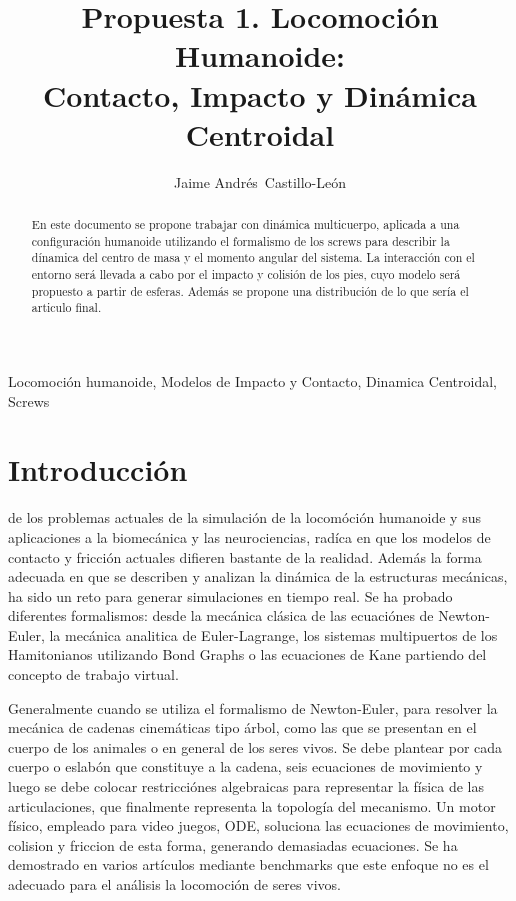\documentclass[journal,letterpaper,twoside,twocolumn]{IEEEtran}
\title{Propuesta 1. Locomoción Humanoide:\\Contacto, Impacto y Dinámica Centroidal}
\author{Jaime Andrés~Castillo-León}
\begin{document}
\maketitle
\begin{abstract}
  En este documento se propone trabajar con dinámica multicuerpo, aplicada a una configuración humanoide utilizando el formalismo de los screws para describir la dínamica del centro de masa y el momento angular del sistema. La interacción con el entorno será llevada a cabo por el impacto y colisión de los pies, cuyo modelo será propuesto a partir de esferas. Además se propone una distribución de lo que sería el articulo final.
\end{abstract}
\begin{IEEEkeywords}
  Locomoción humanoide, Modelos de Impacto y Contacto, Dinamica Centroidal, Screws
\end{IEEEkeywords}

\section{Introducción}
\label{sec:intro}
 de los problemas actuales de la simulación de la locomóción humanoide y sus aplicaciones a la biomecánica y las neurociencias, radíca en que los modelos de contacto y fricción actuales difieren bastante de la realidad\cite{Todorov2014}. Además la forma adecuada en que se describen y analizan la dinámica de la estructuras mecánicas, ha sido un reto para generar simulaciones en tiempo real\cite{Wensing2016}. Se ha probado diferentes formalismos: desde la mecánica clásica de las ecuaciónes de Newton-Euler, la mecánica analitica de Euler-Lagrange, los sistemas multipuertos de los Hamitonianos utilizando Bond Graphs o las ecuaciones de Kane partiendo del concepto de trabajo virtual. 

Generalmente cuando se utiliza el formalismo de Newton-Euler, para resolver la mecánica de cadenas cinemáticas tipo árbol, como las que se presentan en el cuerpo de los animales o en general de los seres vivos. Se debe plantear por cada cuerpo o eslabón que constituye a la cadena, seis ecuaciones de movimiento y luego se debe colocar restricciónes algebraicas para representar la física de las articulaciones, que finalmente representa la topología del mecanismo\cite{Taga1991}. Un motor físico, empleado para video juegos, ODE\cite{Smith2007}, soluciona las ecuaciones de movimiento, colision y friccion de esta forma, generando demasiadas ecuaciones. Se ha demostrado en varios artículos mediante benchmarks\cite{Sherman2011a,Erez2015} que este enfoque no es el adecuado para el análisis la locomoción de seres vivos\cite{Geijtenbeek2013,Wensing2015}.
\end{document}
